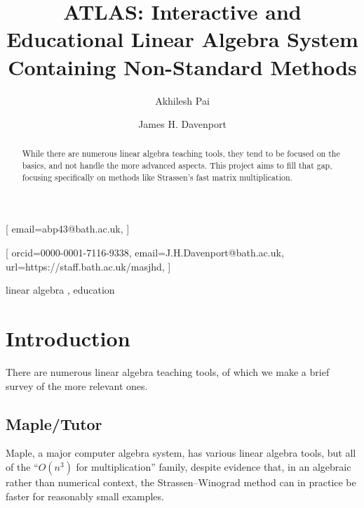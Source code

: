 \documentclass[
]{ceurart}
\begin{document}


\title{ATLAS: Interactive and Educational Linear Algebra System Containing Non-Standard Methods}

\author[1]{Akhilesh Pai}[%
email=abp43@bath.ac.uk,
]
\address[1]{University of Bath, Bath BA2 7AY, UK}
\author[1]{James H. Davenport}[%
orcid=0000-0001-7116-9338,
email=J.H.Davenport@bath.ac.uk,
url=https://staff.bath.ac.uk/masjhd,
]

\begin{abstract}
While there are numerous linear algebra teaching tools, they tend to be focused on the basics, and not handle the more advanced aspects. This project aims to fill that gap, focusing specifically on methods like Strassen's fast matrix multiplication.
\end{abstract}

\begin{keywords}
  linear algebra \sep
  education
\end{keywords}

\maketitle
\section{Introduction}
There are numerous linear algebra teaching tools, of which we make a brief survey of the more relevant ones.
\subsection{Maple/Tutor}
Maple, a major computer algebra system, has various linear algebra tools, but all of the ``$O(n^3)$ for multiplication'' family, despite evidence \cite{Tonksetal2017a} that, in an algebraic rather than numerical context, the Strassen--Winograd \cite{Strassen1969,Winograd1971} method can in practice be faster for reasonably small examples.
\end{document}
